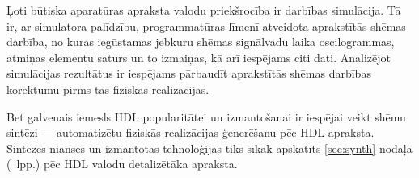 Ļoti būtiska aparatūras apraksta valodu priekšrocība ir darbības simulācija.
Tā ir, ar simulatora palīdzību, programmatūras līmenī 
atveidota aprakstītās shēmas darbība, no kuras iegūstamas jebkuru
shēmas signālvadu laika oscilogrammas, atmiņas elementu saturs un to izmaiņas,
kā arī iespējams citi dati. Analizējot simulācijas rezultātus ir 
iespējams pārbaudīt aprakstītās shēmas darbības korektumu pirms
tās fiziskās realizācijas.

Bet galvenais iemesls HDL popularitātei un izmantošanai ir iespējai veikt 
shēmu sintēzi --- automatizētu fiziskās realizācijas ģenerēšanu pēc HDL apraksta.%
\cite{HDL}\cite{Perry-VHDL}\cite{Vahid-RTL}
Sintēzes nianses un izmantotās tehnoloģijas 
tiks sīkāk apskatīts \ref{sec:synth} nodaļā (\pageref{sec:synth}~lpp.) pēc
HDL valodu detalizētāka apraksta. \pagebreak[1]



		



